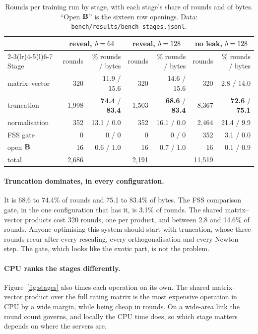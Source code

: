 \begin{table}[t]
\centering
\small
\caption{Rounds per training run by stage, with each stage's share of rounds and
of bytes. ``Open $\mathbf{B}$'' is the sixteen row openings. Data:
\texttt{bench/results/bench\_stages.jsonl}.}
\label{tab:stages}
\begin{tabular}{@{}lrrrrrr@{}}
\toprule
 & \multicolumn{2}{c}{reveal, $b = 64$} & \multicolumn{2}{c}{reveal,
 $b = 128$} & \multicolumn{2}{c}{no leak, $b = 128$} \\
\cmidrule(lr){2-3}\cmidrule(lr){4-5}\cmidrule(l){6-7}
Stage & rounds & \% rounds / bytes & rounds & \% rounds / bytes & rounds &
  \% rounds / bytes \\
\midrule
matrix--vector & 320 & 11.9 / 15.6 & 320 & 14.6 / 15.6 & 320 & 2.8 / 14.0 \\
truncation & 1{,}998 & \textbf{74.4} / \textbf{83.4} & 1{,}503 & \textbf{68.6} /
  \textbf{83.4} & 8{,}367 & \textbf{72.6} / \textbf{75.1} \\
normalisation & 352 & 13.1 / 0.0 & 352 & 16.1 / 0.0 & 2{,}464 & 21.4 / 9.9 \\
FSS gate & 0 & 0 / 0 & 0 & 0 / 0 & 352 & 3.1 / 0.0 \\
open $\mathbf{B}$ & 16 & 0.6 / 1.0 & 16 & 0.7 / 1.0 & 16 & 0.1 / 0.9 \\
\midrule
total & 2{,}686 & & 2{,}191 & & 11{,}519 & \\
\bottomrule
\end{tabular}
\end{table}

\paragraph{Truncation dominates, in every configuration.} It is 68.6 to 74.4\%
of rounds and 75.1 to 83.4\% of bytes. The FSS comparison gate, in the one
configuration that has it, is 3.1\% of rounds. The shared matrix--vector products
cost 320 rounds, one per product, and between 2.8 and 14.6\% of rounds.
Anyone optimising this system should start with truncation, whose three rounds
recur after every rescaling, every orthogonalisation and every Newton step. The
gate, which looks like the exotic part, is not the problem.

\paragraph{CPU ranks the stages differently.} Figure~\ref{fig:stages} also times
each operation on its own. The shared matrix--vector product over the full rating
matrix is the most expensive operation in CPU by a wide margin, while being cheap
in rounds. On a wide-area link the round count governs, and locally the CPU time
does, so which stage matters depends on where the servers are.

